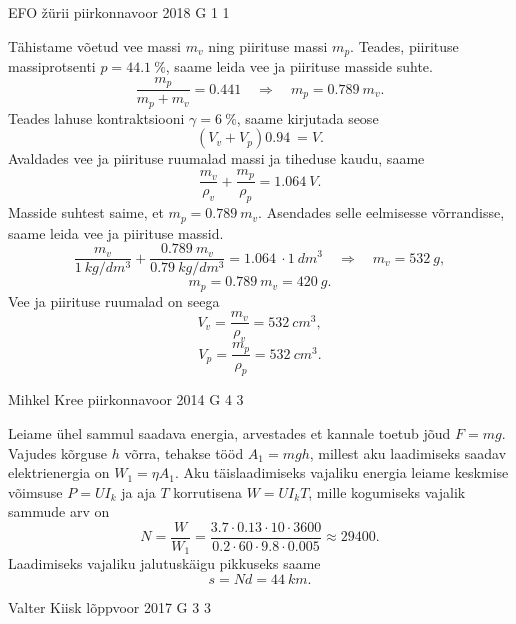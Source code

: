 \documentclass[11pt, twoside]{article}
\begin{document}
{%
{EFO žürii} %
{piirkonnavoor} %
{2018} %
{G 1} %
{1} %
{

\ifSolution
Tähistame võetud vee massi $m_v$ ning piirituse massi $m_p$. Teades, piirituse massiprotsenti $p = \SI{44,1}{\percent}$, saame leida vee ja piirituse masside suhte.
\[ \frac{m_p}{m_p+m_v}=\SI{0,441} \quad\Rightarrow\quad m_p=\SI{0,789}{}m_v.\]
Teades lahuse kontraktsiooni $\gamma = \SI{6}{\percent}$, saame kirjutada seose
\[ (V_v + V_p)\SI{0,94}{} = V.\]
Avaldades vee ja piirituse ruumalad massi ja tiheduse kaudu, saame
\[ \frac{m_v}{\rho_v} + \frac{m_p}{\rho_p} = \SI{1,064}{}V.\]
Masside suhtest saime, et $m_p=\SI{0,789}{}m_v$. Asendades selle eelmisesse võrrandisse, saame leida vee ja piirituse massid.
\[ \frac{m_v}{\SI{1}{kg/dm^3}} + \frac{\SI{0,789}{}{m_v}}{\SI{0,79}{kg/dm^3}} = \SI{1,064}{}\cdot\SI{1}{dm^3} \quad\Rightarrow\quad
m_v = \SI{532}{g},\]
\[ m_p = \SI{0,789}{}m_v = \SI{420}{g}.\]
Vee ja piirituse ruumalad on seega
\[ V_v = \frac{m_v}{\rho_v} = \SI{532}{cm^3},\]
\[ V_p = \frac{m_p}{\rho_p} = \SI{532}{cm^3}.\]
\fi
}

{Mihkel Kree} %
{piirkonnavoor} %
{2014} %
{G 4} %
{3} %
{

\ifSolution
Leiame ühel sammul saadava energia, arvestades et kannale toetub jõud $F=mg$. Vajudes kõrguse $h$ võrra, tehakse tööd $A_1 = mgh$, millest aku laadimiseks saadav elektrienergia on $W_1=\eta A_1$. 
Aku täislaadimiseks vajaliku energia leiame keskmise võimsuse $P=UI_k$ ja aja $T$ korrutisena $W=UI_kT$, mille kogumiseks vajalik sammude arv on
\[N = \frac{W}{W_1} = \frac{3.7 \cdot 0.13 \cdot 10 \cdot 3600 }{0.2 \cdot 60\cdot 9.8 \cdot 0.005}\approx29400.\]
Laadimiseks vajaliku jalutuskäigu pikkuseks saame
\[s=Nd = \SI{44}{km}.\]
\fi
}

{Valter Kiisk} %
{lõppvoor} %
{2017} %
{G 3} %
{3} %
{

}}
\end{document}
